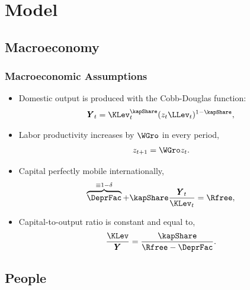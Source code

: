 \documentclass{beamer}
\renewcommand{\GDPLev}{\ensuremath{\pmb{Y}}}
\renewcommand{\ptyLev}{\ensuremath{z}}
\begin{document}
\section{Model}
\subsection{Macroeconomy}

\begin{frame}
\frametitle{Macroeconomic Assumptions}
    \begin{itemize}
    \item Domestic output is produced with the Cobb-Douglas function:
\begin{eqnarray}
\GDPLev_t=\KLev_t^{\kapShare}(\ptyLev_t \LLev_t)^{1-\kapShare},
\end{eqnarray}
    \item Labor productivity increases by $\WGro$ in every period,
\begin{eqnarray}
\ptyLev_{t+1}=\WGro \ptyLev_t.
\end{eqnarray}
    \item Capital perfectly mobile internationally,
\begin{eqnarray}
\overbrace{\DeprFac}^{\equiv 1-\delta}+\kapShare \frac{\GDPLev_t}{\KLev_t}=\Rfree,
\end{eqnarray}
    \item Capital-to-output ratio is constant and equal to,
\begin{eqnarray}
\frac{\KLev}{\GDPLev}=\frac{\kapShare}{\Rfree-\DeprFac}.
\end{eqnarray}
    \end{itemize}
\end{frame}

\subsection{People}
\end{document}
